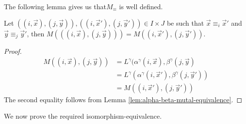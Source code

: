 \documentclass[../paper.tex]{subfiles}
\begin{document}

The following lemma gives us that$M_\equiv$ is well defined.

\begin{lem}
  Let $((i, \vec{x}), (j, \vec{y})), ((i, \vec{x}'), (j, \vec{y}')) \in I \times
  J$ be such that $\vec{x} \equiv_i \vec{x}'$ and $\vec{y} \equiv_j \vec{y}'$,
  then $M(((i, \vec{x}), (j, \vec{y}))) = M((i, \vec{x}'), (j, \vec{y}'))$.
  \label{lem:matrix-quot-well-defined}
\end{lem}
\begin{proof}
  \begin{align*}
    M((i, \vec{x}),(j, \vec{y})) &= L^{\gamma}(\alpha^{\gamma}(i, \vec{x}), \beta^{\gamma}(j, \vec{y}) \\
                                 &= L^{\gamma}(\alpha^{\gamma}(i, \vec{x}'), \beta^{\gamma}(j, \vec{y}'))\\
                                 &= M((i, \vec{x}'), (j, \vec{y}'))
  \end{align*}
  The second equality follows from Lemma \ref{lem:alpha-beta-mutal-equivalence}.
\end{proof}

We now prove the required isomorphism-equivalence.
\end{document}
